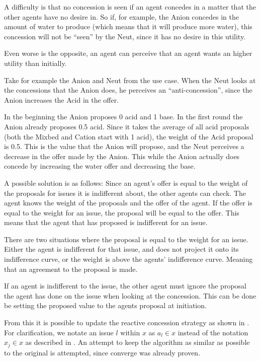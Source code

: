 A difficulty is that no concession is seen if an agent concedes in a matter that the other agents have no desire in. So if, for example, the Anion concedes in the amount of water to produce (which means that it will produce more water), this concession will not be ``seen'' by the Neut, since it has no desire in this utility. 

Even worse is the opposite, an agent can perceive that an agent wants an higher utility than initially. %

Take for example the Anion and Neut from the use case. When the Neut looks at the concessions that the Anion does, he perceives an ``anti-concession'', since the Anion increases the Acid in the offer. 

In the beginning the Anion proposes 0 acid and 1 base. In the first round the Anion already proposes 0.5 acid. Since it takes the average of all acid proposals (both the Mixbed and Cation start with 1 acid), the weight of the Acid proposal is 0.5. This is the value that the Anion will propose, and the Neut perceives a decrease in the offer made by the Anion. This while the Anion actually does concede by increasing the water offer and decreasing the base.

A possible solution is as follows:
Since an agent's offer is equal to the weight of the proposals for issues it is indifferent about, the other agents can check. The agent knows the weight of the proposals and the offer of the agent. If the offer is equal to the weight for an issue, the proposal will be equal to the offer. This means that the agent that has proposed is indifferent for an issue. 

There are two situations where the proposal is equal to the weight for an issue. Either the agent is indifferent for that issue, and does not project it onto its indifference curve, or the weight is above the agents' indifference curve. Meaning that an agreement to the proposal is made.

If an agent is indifferent to the issue, the other agent must ignore the proposal the agent has done on the issue when looking at the concession. This can be done be setting the proposed value to the agents proposal at initiation.

From this it is possible to update the reactive concession strategy as shown in . For clarification, we notate an issue $l$ within $x$ as $a_l\in x$ instead of the notation $x_j \in x$ as described in . An attempt to keep the algorithm as similar as possible to the original is attempted, since converge was already proven.

